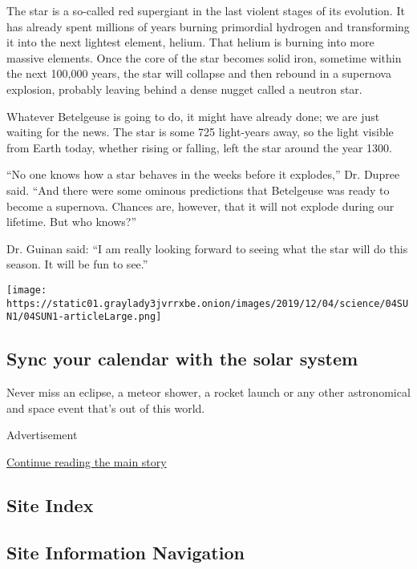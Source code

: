 The star is a so-called red supergiant in the last violent stages of its
evolution. It has already spent millions of years burning primordial
hydrogen and transforming it into the next lightest element, helium.
That helium is burning into more massive elements. Once the core of the
star becomes solid iron, sometime within the next 100,000 years, the
star will collapse and then rebound in a supernova explosion, probably
leaving behind a dense nugget called a neutron star.

Whatever Betelgeuse is going to do, it might have already done; we are
just waiting for the news. The star is some 725 light-years away, so the
light visible from Earth today, whether rising or falling, left the star
around the year 1300.

``No one knows how a star behaves in the weeks before it explodes,'' Dr.
Dupree said. ``And there were some ominous predictions that Betelgeuse
was ready to become a supernova. Chances are, however, that it will not
explode during our lifetime. But who knows?''

Dr. Guinan said: ``I am really looking forward to seeing what the star
will do this season. It will be fun to see.''

\href{https://www.nytimes3xbfgragh.onion/interactive/2020/science/2020-astronomy-space-calendar.html}{}

\texttt{[image: https://static01.graylady3jvrrxbe.onion/images/2019/12/04/science/04SUN1/04SUN1-articleLarge.png]}

\hypertarget{sync-your-calendar-with-the-solar-system}{%
\subsection{Sync your calendar with the solar
system}\label{sync-your-calendar-with-the-solar-system}}

Never miss an eclipse, a meteor shower, a rocket launch or any other
astronomical and space event that's out of this world.

Advertisement

\protect\hyperlink{after-bottom}{Continue reading the main story}

\hypertarget{site-index}{%
\subsection{Site Index}\label{site-index}}

\hypertarget{site-information-navigation}{%
\subsection{Site Information
Navigation}\label{site-information-navigation}}

